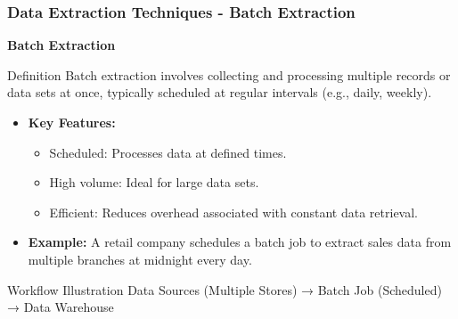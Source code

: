 \documentclass[aspectratio=169]{beamer}
\begin{document}
\begin{frame}[fragile]
    \frametitle{Data Extraction Techniques - Batch Extraction}
    \textbf{Batch Extraction}
    
    \begin{block}{Definition}
        Batch extraction involves collecting and processing multiple records or data sets at once, typically scheduled at regular intervals (e.g., daily, weekly).
    \end{block}
    
    \begin{itemize}
        \item \textbf{Key Features:}
        \begin{itemize}
            \item Scheduled: Processes data at defined times.
            \item High volume: Ideal for large data sets.
            \item Efficient: Reduces overhead associated with constant data retrieval.
        \end{itemize}
        \item \textbf{Example:}
            A retail company schedules a batch job to extract sales data from multiple branches at midnight every day.
    \end{itemize}
    
    \begin{block}{Workflow Illustration}
        Data Sources (Multiple Stores) → Batch Job (Scheduled) → Data Warehouse
    \end{block}
\end{frame}
\end{document}
